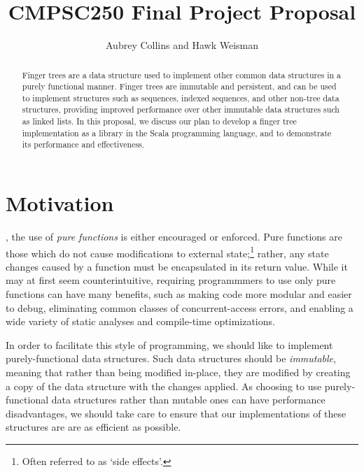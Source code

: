 \documentclass[a4paper,nobib]{tufte-handout}
\title{CMPSC250 Final Project Proposal}
\author{Aubrey Collins and Hawk Weisman}
\begin{document}
\maketitle
\begin{abstract}
Finger trees are a data structure used to implement other common data structures in a purely functional manner.\cite{Hinze:2006:FTS:1114670.1114674} Finger trees are immutable and persistent, and can be used to implement structures such as sequences, indexed sequences, and other non-tree data structures, providing improved performance over other immutable data structures such as linked lists. In this proposal, we discuss our plan to develop a finger tree implementation as a library in the Scala programming language, and to demonstrate its performance and effectiveness. 
\end{abstract}

\section{Motivation}
, the use of \textit{pure functions} is either encouraged or enforced. Pure functions are those which do not cause modifications to external state;\footnote{Often referred to as `side effects'.} rather, any state changes caused by a function must be encapsulated in its return value.\cite{JFP:44143} While it may at first seem counterintuitive, requiring programmmers to use only pure functions can have many benefits, such as making code more modular and easier to debug, eliminating common classes of concurrent-access errors, and enabling a wide variety of static analyses and compile-time optimizations.

In order to facilitate this style of programming, we should like to implement purely-functional data structures. Such data structures should be \textit{immutable}, meaning that rather than being modified in-place, they are modified by creating a copy of the data structure with the changes applied.\cite{okasaki1999purely} As choosing to use purely-functional data structures rather than mutable ones can have performance disadvantages, we should take care to ensure that our implementations of these structures are are as efficient as possible.




\end{document}
